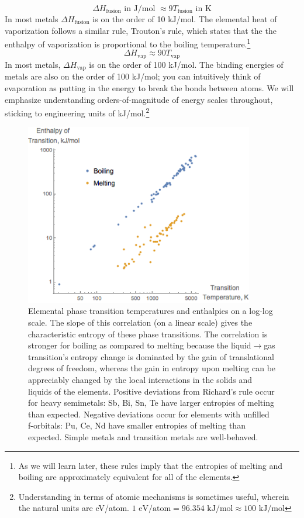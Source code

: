 \documentclass[12pt]{article}
\begin{document}
\begin{equation}
\Delta H_\text{fusion} \text{ in J/mol } \approx 9 T_\text{fusion} \text{ in K}
\end{equation}
In most metals $\Delta H_\text{fusion}$ is on the order of 10 kJ/mol.  The elemental heat of vaporization follows a similar rule, Trouton's rule, which states that the the enthalpy of vaporization is proportional to the boiling temperature.\footnote{As we will learn later, these rules imply that the entropies of melting and boiling are approximately equivalent for all of the elements.}
\begin{equation}
\Delta H_\text{vap} \approx 90 T_\text{vap}
\end{equation}
In most metals,  $\Delta H_\text{vap}$ is on the order of 100 kJ/mol.  The binding energies of metals are also on the order of 100 kJ/mol; you can intuitively think of evaporation as putting in the energy to break the bonds between atoms. We will emphasize understanding orders-of-magnitude of energy scales throughout, sticking to engineering units of kJ/mol.\footnote{Understanding in terms of atomic mechanisms is sometimes useful, wherein the natural units are eV/atom. $1 \text{ eV/atom}= 96.354\text{ kJ/mol}\approx 100\text{ kJ/mol}$}

\begin{figure}[h]
\centering
\includegraphics[width = 10cm]{Trouton_and_Richards_rules.png}
\caption{Elemental phase transition temperatures and enthalpies on a log-log scale. The slope of this correlation (on a linear scale) gives the characteristic entropy of these phase transitions. The correlation is stronger for boiling as compared to melting because the liquid$\to$gas transition's entropy change is dominated by the gain of translational degrees of freedom, whereas the gain in entropy upon melting can be appreciably changed by the local interactions in the solids and liquids of the elements. Positive deviations from Richard's rule occur for heavy semimetals: Sb, Bi, Sn, Te have larger entropies of melting than expected. Negative deviations occur for elements with unfilled f-orbitals: Pu, Ce, Nd have smaller entropies of melting than expected. Simple metals and transition metals are well-behaved.}
\end{figure}
\end{document}

